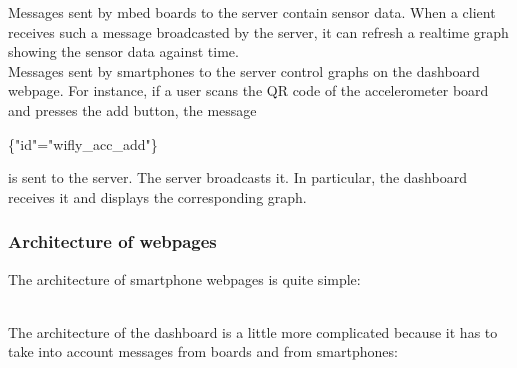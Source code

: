 \documentclass[pdftex,10pt,a4paper]{report}
\newenvironment{packed_item}{
\begin{itemize}
  \setlength{\itemsep}{1pt}
  \setlength{\parskip}{0pt}
  \setlength{\parsep}{0pt}
}{\end{itemize}}
\begin{document}
Messages sent by mbed boards to the server contain sensor data. When a client receives such a message broadcasted by the server, it can refresh a realtime graph showing the sensor data against time. \\

Messages sent by smartphones to the server control graphs on the dashboard webpage. For instance, if a user scans the QR code of the accelerometer board and presses the add button, the message 
		\begin{center}
				\{"id"="wifly\_acc\_add"\}
		\end{center}
is sent to the server. The server broadcasts it. In particular, the dashboard receives it and displays the corresponding graph.

\newpage

\subsubsection{Architecture of webpages}
The architecture of smartphone webpages is quite simple:

 \\

The architecture of the dashboard is a little more complicated because it has to take into account messages from boards and from smartphones:
\end{document}
